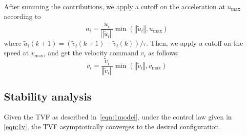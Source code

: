 After summing the contributions, we apply a cutoff on the acceleration at $u_\text{max}$ according to
\begin{equation}
    u_i=\dfrac{\tilde{u}_i}{\left\Vert\tilde{u}_i\right\Vert}\min(\left\Vert\tilde{u}_i\right\Vert, u_\text{max})
\end{equation}
where $\tilde{u}_i(k+1) =(\tilde{v}_i(k+1)-\tilde{v}_i(k)) /\tau$. Then, we apply a cutoff on the speed at $v_\text{max}$, and get the velocity command $v_i$ as follows:
\begin{equation}
    v_i=\dfrac{\tilde{v}_i}{\left\Vert\tilde{v}_i\right\Vert}\min(\left\Vert\tilde{v}_i\right\Vert, v_\text{max})
\end{equation}

\subsection{Stability analysis}
\begin{theorem}\label{the:stability}
Given the TVF as described in~\eqref{eqn:1model}, under the control law given in \eqref{eqn:1v}, the TVF asymptotically converges to the desired configuration.
\end{theorem}
